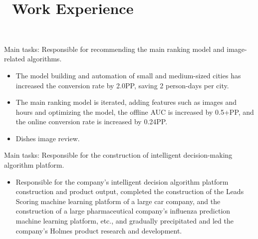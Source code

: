 \documentclass{resume}
\begin{document}



\section{\faUsers\ Work Experience}

\
\begin{onehalfspacing}
Main tasks: Responsible for recommending the main ranking model and image-related algorithms.
\begin{itemize}
\item The model building and automation of small and medium-sized cities has increased the conversion rate by 2.0PP, saving 2 person-days per city.
\item The main ranking model is iterated, adding features such as images and hours and optimizing the model, the offline AUC is increased by 0.5+PP, and the online conversion rate is increased by 0.24PP.
\item Dishes image review.
\end{itemize}
\end{onehalfspacing}

\begin{onehalfspacing}
Main tasks: Responsible for the construction of intelligent decision-making algorithm platform.
\begin{itemize}
\item  Responsible for the company's intelligent decision algorithm platform construction and product output, completed the construction of the Leads Scoring machine learning platform of a large car company, and the construction of a large pharmaceutical company's influenza prediction machine learning platform, etc., and gradually precipitated and led the company's Holmes product research and development.
\end{itemize}
\end{onehalfspacing}
\end{document}
